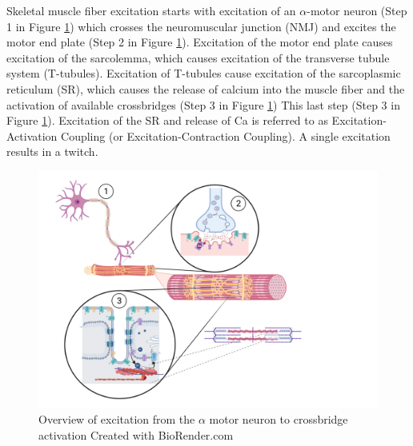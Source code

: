 Skeletal muscle fiber excitation starts with excitation of an $\alpha$-motor neuron (Step 1 in Figure \ref{fig:excitation_overview}) which crosses the neuromuscular junction (NMJ) and excites the motor end plate (Step 2 in Figure \ref{fig:excitation_overview}). Excitation of the motor end plate causes excitation of the sarcolemma, which causes excitation of the transverse tubule system (T-tubules). Excitation of T-tubules cause excitation of the sarcoplasmic reticulum (SR), which causes the release of calcium into the muscle fiber and the activation of available crossbridges (Step 3 in Figure \ref{fig:excitation_overview}) This last step (Step 3 in Figure \ref{fig:excitation_overview}). Excitation of the SR and release of Ca is referred to as Excitation-Activation Coupling (or Excitation-Contraction Coupling). A single excitation results in a twitch.


\begin{figure}[!ht]
    \centering
    \includegraphics[width=1\linewidth]{./figure/excitation_overview.png}
    \caption{Overview of excitation from the $\alpha$ motor neuron to crossbridge activation \footnotesize{Created with BioRender.com}}
    \label{fig:excitation_overview}
\end{figure}

